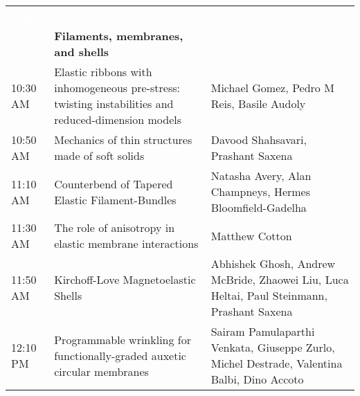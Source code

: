 \begin{tabularx}{\linewidth}{C{15mm}YP{50mm}}
\textcolor{white}{\textbf{4Q08}} & & \\
& \textbf{Filaments, membranes, and shells} & \\
10:30 AM & Elastic ribbons with inhomogeneous pre-stress: twisting instabilities and reduced-dimension models & Michael Gomez, Pedro M Reis, Basile Audoly\\
10:50 AM & Mechanics of thin structures made of soft solids & Davood Shahsavari, Prashant Saxena\\
11:10 AM & Counterbend of Tapered Elastic Filament-Bundles & Natasha Avery, Alan Champneys, Hermes Bloomfield-Gadelha\\
11:30 AM & The role of anisotropy in elastic membrane interactions & Matthew Cotton\\
11:50 AM & Kirchoff-Love Magnetoelastic Shells & Abhishek Ghosh, Andrew McBride, Zhaowei Liu, Luca Heltai, Paul Steinmann, Prashant Saxena\\
12:10 PM & Programmable wrinkling for functionally-graded auxetic circular membranes & Sairam Pamulaparthi Venkata, Giuseppe Zurlo, Michel Destrade, Valentina Balbi, Dino Accoto\\
\end{tabularx}

